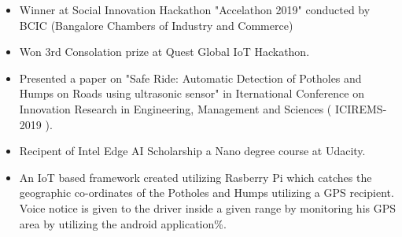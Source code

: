 
\begin{itemize}
\item Winner at Social Innovation Hackathon "Accelathon 2019" conducted by BCIC (Bangalore Chambers of Industry and Commerce)
\item Won 3rd Consolation prize at Quest Global IoT Hackathon.
\end{itemize}

\begin{itemize}
    \item Presented a paper on "Safe Ride: Automatic Detection of Potholes and Humps on Roads using ultrasonic sensor" in Iternational Conference on Innovation Research in Engineering, Management and Sciences ( ICIREMS-2019 ).
    \item Recipent of Intel Edge AI Scholarship a Nano degree course at Udacity.
\end{itemize}








\begin{itemize}
\item An IoT based framework created utilizing Rasberry Pi which catches the geographic co-ordinates of the Potholes and Humps utilizing a GPS recipient. Voice notice is given to the driver inside a given range by monitoring his GPS area by utilizing the android application\%.
\end{itemize}

